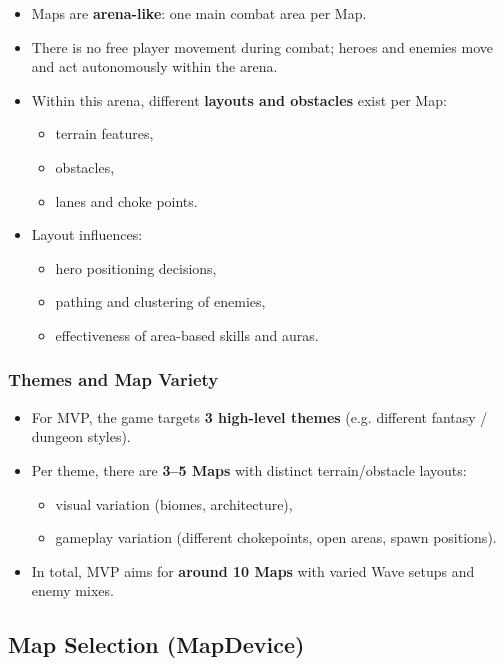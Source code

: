 \begin{itemize}
	\item Maps are \textbf{arena-like}: one main combat area per Map.
	\item There is no free player movement during combat; heroes and enemies move and act autonomously within the arena.
	\item Within this arena, different \textbf{layouts and obstacles} exist per Map:
	\begin{itemize}
		\item terrain features,
		\item obstacles,
		\item lanes and choke points.
	\end{itemize}
	\item Layout influences:
	\begin{itemize}
		\item hero positioning decisions,
		\item pathing and clustering of enemies,
		\item effectiveness of area-based skills and auras.
	\end{itemize}
\end{itemize}

\subsubsection*{Themes and Map Variety}

\begin{itemize}
	\item For MVP, the game targets \textbf{3 high-level themes} (e.g. different fantasy / dungeon styles).
	\item Per theme, there are \textbf{3--5 Maps} with distinct terrain/obstacle layouts:
	\begin{itemize}
		\item visual variation (biomes, architecture),
		\item gameplay variation (different chokepoints, open areas, spawn positions).
	\end{itemize}
	\item In total, MVP aims for \textbf{around 10 Maps} with varied Wave setups and enemy mixes.
\end{itemize}


\subsection{Map Selection (MapDevice)}

